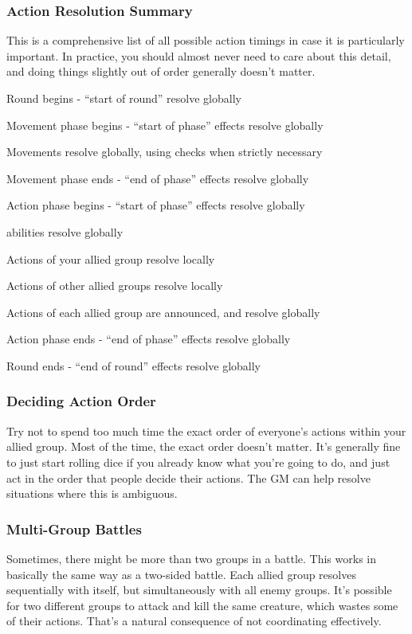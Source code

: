     \subsubsection{Action Resolution Summary}
      This is a comprehensive list of all possible action timings in case it is particularly important.
      In practice, you should almost never need to care about this detail, and doing things slightly out of order generally doesn't matter.

      \begin{enumerate*}
        \item Round begins - ``start of round'' resolve globally
        \item Movement phase begins - ``start of phase'' effects resolve globally
        \item Movements resolve globally, using  checks when strictly necessary
        \item Movement phase ends - ``end of phase'' effects resolve globally
        \item Action phase begins - ``start of phase'' effects resolve globally
        \item {} abilities resolve globally
        \item Actions of your allied group resolve locally
        \item Actions of other allied groups resolve locally
        \item Actions of each allied group are announced, and resolve globally
        \item Action phase ends - ``end of phase'' effects resolve globally
        \item Round ends - ``end of round'' effects resolve globally
      \end{enumerate*}

    \subsubsection{Deciding Action Order}\label{Deciding Action Order}
      Try not to spend too much time the exact order of everyone's actions within your allied group.
      Most of the time, the exact order doesn't matter.
      It's generally fine to just start rolling dice if you already know what you're going to do, and just act in the order that people decide their actions.
      The GM can help resolve situations where this is ambiguous.

    \subsubsection{Multi-Group Battles}\label{Multi-Group Battles}
      Sometimes, there might be more than two groups in a battle.
      This works in basically the same way as a two-sided battle.
      Each allied group resolves sequentially with itself, but simultaneously with all enemy groups.
      It's possible for two different groups to attack and kill the same creature, which wastes some of their actions.
      That's a natural consequence of not coordinating effectively.

